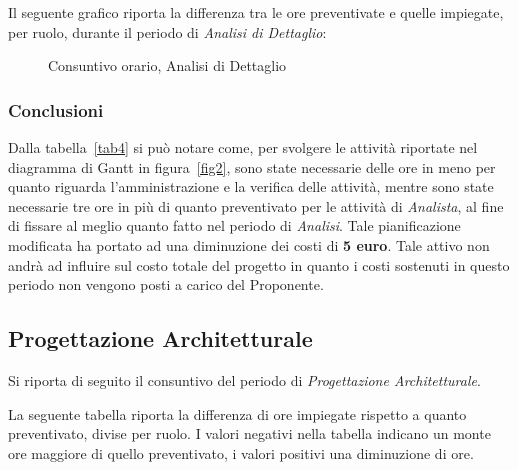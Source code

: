 \newpage
\noindent Il seguente grafico riporta la differenza tra le ore preventivate e quelle impiegate, per ruolo, durante il periodo di \textit{Analisi di Dettaglio}:
\begin{figure}[h]
	\centering
	\caption{Consuntivo orario, Analisi di Dettaglio}
\end{figure}

\subsubsection{Conclusioni}
Dalla tabella~\ref{tab4} si può notare come, per svolgere le attività riportate nel diagramma di \gls{Gantt} in figura~\ref{fig2}, sono state necessarie delle ore in meno per quanto riguarda l'amministrazione e la verifica delle attività, mentre sono state necessarie tre ore in più di quanto preventivato per le attività di \textit{Analista}, al fine di fissare al meglio quanto fatto nel periodo di \textit{Analisi}. Tale pianificazione modificata ha portato ad una diminuzione dei costi di \textbf{5 euro}. Tale attivo non andrà ad influire sul costo totale del progetto in quanto i costi sostenuti in questo periodo non vengono posti a carico del Proponente. 

\subsection{Progettazione Architetturale}
Si riporta di seguito il consuntivo del periodo di \textit{Progettazione Architetturale}.

\noindent La seguente tabella riporta la differenza di ore impiegate rispetto a quanto preventivato, divise per ruolo. I valori negativi nella tabella indicano un monte ore maggiore di quello preventivato, i valori positivi una diminuzione di ore.

